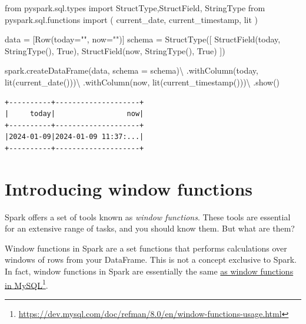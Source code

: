 \documentclass[
  11pt,
  letterpaper,
  DIV=11,
  numbers=noendperiod]{scrreprt}
\newenvironment{Shaded}{\begin{snugshade}}{\end{snugshade}}
\newcommand{\ImportTok}[1]{\textcolor[rgb]{0.00,0.46,0.62}{#1}}
\newcommand{\NormalTok}[1]{\textcolor[rgb]{0.00,0.23,0.31}{#1}}
\newcommand{\OperatorTok}[1]{\textcolor[rgb]{0.37,0.37,0.37}{#1}}
\newcommand{\StringTok}[1]{\textcolor[rgb]{0.13,0.47,0.30}{#1}}
\newcommand{\VariableTok}[1]{\textcolor[rgb]{0.07,0.07,0.07}{#1}}
\begin{document}
\begin{Shaded}
\begin{Highlighting}[]
\ImportTok{from}\NormalTok{ pyspark.sql.types }\ImportTok{import}\NormalTok{ StructType,StructField, StringType}
\ImportTok{from}\NormalTok{ pyspark.sql.functions }\ImportTok{import}\NormalTok{ (}
\NormalTok{    current\_date,}
\NormalTok{    current\_timestamp,}
\NormalTok{    lit}
\NormalTok{)}

\NormalTok{data }\OperatorTok{=}\NormalTok{ [Row(today}\OperatorTok{=}\StringTok{""}\NormalTok{, now}\OperatorTok{=}\StringTok{""}\NormalTok{)]}
\NormalTok{schema }\OperatorTok{=}\NormalTok{ StructType([}
\NormalTok{    StructField(}\StringTok{\textquotesingle{}today\textquotesingle{}}\NormalTok{, StringType(), }\VariableTok{True}\NormalTok{),}
\NormalTok{    StructField(}\StringTok{\textquotesingle{}now\textquotesingle{}}\NormalTok{, StringType(), }\VariableTok{True}\NormalTok{)}
\NormalTok{])}

\NormalTok{spark.createDataFrame(data, schema }\OperatorTok{=}\NormalTok{ schema)}\OperatorTok{\textbackslash{}}
\NormalTok{    .withColumn(}\StringTok{\textquotesingle{}today\textquotesingle{}}\NormalTok{, lit(current\_date()))}\OperatorTok{\textbackslash{}}
\NormalTok{    .withColumn(}\StringTok{\textquotesingle{}now\textquotesingle{}}\NormalTok{, lit(current\_timestamp()))}\OperatorTok{\textbackslash{}}
\NormalTok{    .show()}
\end{Highlighting}
\end{Shaded}

\begin{verbatim}
+----------+--------------------+
|     today|                 now|
+----------+--------------------+
|2024-01-09|2024-01-09 11:37:...|
+----------+--------------------+
\end{verbatim}


\chapter{Introducing window functions}\label{sec-window-functions}

Spark offers a set of tools known as \emph{window functions}. These
tools are essential for an extensive range of tasks, and you should know
them. But what are them?

Window functions in Spark are a set functions that performs calculations
over windows of rows from your DataFrame. This is not a concept
exclusive to Spark. In fact, window functions in Spark are essentially
the same
\href{https://dev.mysql.com/doc/refman/8.0/en/window-functions-usage.html}{as
window functions in MySQL}\footnote{\url{https://dev.mysql.com/doc/refman/8.0/en/window-functions-usage.html}}.
\end{document}
